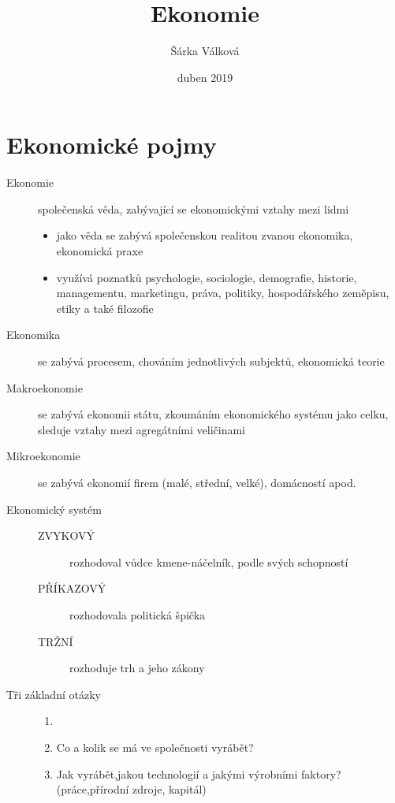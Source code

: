 \documentclass[11pt,a4paper,twoside]{book}
\title{Ekonomie}
\author{Šárka Válková}
\date{duben 2019}
\begin{document}
	
	\maketitle
	\newpage
	\frenchspacing
	
	
	
	\chapter{Ekonomické pojmy}
	
	\begin{description}
		\item[Ekonomie] společenská věda, zabývající se ekonomickými vztahy mezi lidmi
		\begin{itemize}
			\item jako věda se zabývá společenskou realitou zvanou ekonomika, ekonomická praxe
			\item využívá poznatků psychologie, sociologie, demografie, historie, managementu, marketingu, práva, politiky, hospodářského zeměpisu, etiky a také filozofie
		\end{itemize}
		\item[Ekonomika] se zabývá procesem, chováním jednotlivých subjektů, ekonomická teorie
		\item[Makroekonomie] se zabývá ekonomii státu, zkoumáním ekonomického systému jako celku, sleduje vztahy mezi agregátními veličinami
		\item[Mikroekonomie] se zabývá ekonomií firem (malé, střední, velké), domácností apod.
		\item[Ekonomický systém]
		\begin{description}
			\item[]
			\item[ZVYKOVÝ] rozhodoval vůdce kmene-náčelník, podle svých schopností
			\item[PŘÍKAZOVÝ] rozhodovala politická špička
			\item[TRŽNÍ] rozhoduje trh a jeho zákony
		\end{description}
		\item[Tři základní otázky]
		\begin{enumerate}
			\item[]
			\item Co a kolik se má ve společnosti vyrábět?
			\item Jak vyrábět,jakou technologií a jakými výrobními faktory?(práce,přírodní zdroje, kapitál)

\end{enumerate}
\end{description}
\end{document}
